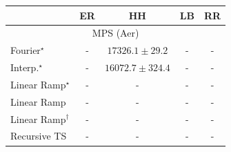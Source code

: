 \begin{tabular}{l|cccc|}
\toprule
            & ER & HH & LB & RR \\
\midrule
\multicolumn{5}{c}{\rule{0pt}{8pt}MPS (Aer)} \\
\midrule
Fourier$^\star$ & {\cellcolor[HTML]{000000}} \color[HTML]{F1F1F1} {\cellcolor{white}} \color{black} - & {\cellcolor[HTML]{4D004B}} \color[HTML]{F1F1F1} $17326.1\pm 29.2$ & {\cellcolor[HTML]{000000}} \color[HTML]{F1F1F1} {\cellcolor{white}} \color{black} - & {\cellcolor[HTML]{000000}} \color[HTML]{F1F1F1} {\cellcolor{white}} \color{black} - \\
Interp.$^\star$ & {\cellcolor[HTML]{000000}} \color[HTML]{F1F1F1} {\cellcolor{white}} \color{black} - & {\cellcolor[HTML]{F7FCFD}} \color[HTML]{000000} $16072.7\pm 324.4$ & {\cellcolor[HTML]{000000}} \color[HTML]{F1F1F1} {\cellcolor{white}} \color{black} - & {\cellcolor[HTML]{000000}} \color[HTML]{F1F1F1} {\cellcolor{white}} \color{black} - \\
Linear Ramp$^\star$ & {\cellcolor[HTML]{000000}} \color[HTML]{F1F1F1} {\cellcolor{white}} \color{black} - & {\cellcolor[HTML]{000000}} \color[HTML]{F1F1F1} {\cellcolor{white}} \color{black} - & {\cellcolor[HTML]{000000}} \color[HTML]{F1F1F1} {\cellcolor{white}} \color{black} - & {\cellcolor[HTML]{000000}} \color[HTML]{F1F1F1} {\cellcolor{white}} \color{black} - \\
Linear Ramp & {\cellcolor[HTML]{000000}} \color[HTML]{F1F1F1} {\cellcolor{white}} \color{black} - & {\cellcolor[HTML]{000000}} \color[HTML]{F1F1F1} {\cellcolor{white}} \color{black} - & {\cellcolor[HTML]{000000}} \color[HTML]{F1F1F1} {\cellcolor{white}} \color{black} - & {\cellcolor[HTML]{000000}} \color[HTML]{F1F1F1} {\cellcolor{white}} \color{black} - \\
Linear Ramp$^\dagger$ & {\cellcolor[HTML]{000000}} \color[HTML]{F1F1F1} {\cellcolor{white}} \color{black} - & {\cellcolor[HTML]{000000}} \color[HTML]{F1F1F1} {\cellcolor{white}} \color{black} - & {\cellcolor[HTML]{000000}} \color[HTML]{F1F1F1} {\cellcolor{white}} \color{black} - & {\cellcolor[HTML]{000000}} \color[HTML]{F1F1F1} {\cellcolor{white}} \color{black} - \\
Recursive TS & {\cellcolor[HTML]{000000}} \color[HTML]{F1F1F1} {\cellcolor{white}} \color{black} - & {\cellcolor[HTML]{000000}} \color[HTML]{F1F1F1} {\cellcolor{white}} \color{black} - & {\cellcolor[HTML]{000000}} \color[HTML]{F1F1F1} {\cellcolor{white}} \color{black} - & {\cellcolor[HTML]{000000}} \color[HTML]{F1F1F1} {\cellcolor{white}} \color{black} - \\

\end{tabular}
